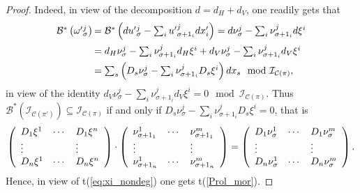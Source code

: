 \documentclass[12pt,english]{elsarticle}
\theoremstyle{plain}
\theoremstyle{plain}
\theoremstyle{remark}
\theoremstyle{plain}
\theoremstyle{definition}
\theoremstyle{definition}
\begin{document}
\begin{proof}
Indeed, in view of the decomposition $d=d_{H}+d_{V}$, one readily gets
that
%
\begin{equation*}
%
\begin{array}{l@{\,}l}
\mathcal{B}^{*}\left (\omega '{}_{\sigma}^{j}\right ) & =\mathcal{B}^{*}
\left (du'{}_{\sigma}^{j}-\sum _{i}u'{}_{\sigma +1_{i}}^{j}dx'_{i}
\right )=d\nu _{\sigma}^{j}-\sum _{i}\nu _{\sigma +1_{i}}^{j}d\xi ^{i}
\vspace{5pt}
\\
& =d_{H}\nu _{\sigma}^{j}-\sum _{i}\nu _{\sigma +1_{i}}^{j}d_{H}\xi ^{i}+d_{V}
\nu _{\sigma}^{j}-\sum _{i}\nu _{\sigma +1_{i}}^{j}d_{V}\xi ^{i}
\vspace{5pt}
\\
& =\sum _{s}\left (D_{s}\nu _{\sigma}^{j}-\sum _{i}\nu _{\sigma +1_{i}}^{j}D_{s}
\xi ^{i}\right )dx_{s}\mod{\mathcal{I}_{\mathcal{C}(\pi )},}
\end{array}
%
\end{equation*}
%
in view of the identity
$d_{V}\nu _{\sigma}^{j}-\sum _{i}\nu _{\sigma +1_{i}}^{j}d_{V}\xi ^{i}=0
\mod{\mathcal{I}_{\mathcal{C}(\pi )}}$. Thus
$\mathcal{B}^{*}\left (\mathcal{I}_{\mathcal{C}(\pi ')}\right )
\subseteq \mathcal{I}_{\mathcal{C}(\pi )}$ if and only if
$D_{s}\nu _{\sigma}^{j}-\sum _{i}\nu _{\sigma +1_{i}}^{j}D_{s}\xi ^{i}=0$,
that is
%
\begin{equation*}
\left (
%
\begin{array}{l@{\quad}l@{\quad}l}
D_{1}\xi ^{1} & \cdots & D_{1}\xi ^{n}
\\
\vdots & & \vdots
\\
D_{n}\xi ^{1} & \cdots & D_{n}\xi ^{n}
\end{array}
%
\right )\cdot \left (
%
\begin{array}{l@{\quad}l@{\quad}l}
\nu _{\sigma +1_{1}}^{1} & \cdots & \nu _{\sigma +1_{1}}^{m}
\\
\vdots & & \vdots
\\
\nu _{\sigma +1_{n}}^{1} & \cdots & \nu _{\sigma +1_{n}}^{m}
\end{array}
%
\right )=\left (
%
\begin{array}{l@{\quad}l@{\quad}l}
D_{1}\nu _{\sigma}^{1} & \cdots & D_{1}\nu _{\sigma}^{m}
\\
\vdots & & \vdots
\\
D_{n}\nu _{\sigma}^{1} & \cdots & D_{n}\nu _{\sigma}^{m}
\end{array}
%
\right ).
\end{equation*}
%
Hence, in view of t{(\ref{eq:xi_nondeg})} one gets t{(\ref{Prol_mor})}.
\end{proof}
\end{document}
